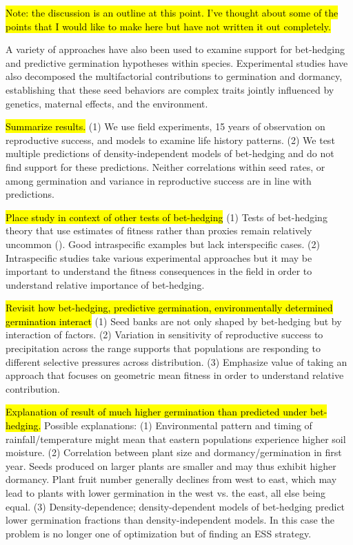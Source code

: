 \documentclass[12pt, oneside, titlepage]{article}   	%
\begin{document}
\hl{Note: the discussion is an outline at this point. I've thought about some of the points that I would like to make here but have not written it out completely.}

A variety of approaches have also been used to examine support for bet-hedging and predictive germination hypotheses within species. Experimental studies have also decomposed the multifactorial contributions to germination and dormancy, establishing that these seed behaviors are complex traits jointly influenced by genetics, maternal effects, and the environment.

\hl{Summarize results.} (1) We use field experiments, 15 years of observation on reproductive success, and models to examine life history patterns. (2) We test multiple predictions of density-independent models of bet-hedging and do not find support for these predictions. Neither correlations within seed rates, or among germination and variance in reproductive success are in line with predictions. 

\hl{Place study in context of other tests of bet-hedging} (1) Tests of bet-hedging theory that use estimates of fitness rather than proxies remain relatively uncommon (\cite{simons2011}). Good intraspecific examples but lack interspecific cases. (2) Intraspecific studies take various experimental approaches but it may be important to understand the fitness consequences in the field in order to understand relative importance of bet-hedging. 

\hl{Revisit how bet-hedging, predictive germination, environmentally determined germination interact} (1) Seed banks are not only shaped by bet-hedging but by interaction of factors. (2) Variation in sensitivity of reproductive success to precipitation across the range supports that populations are responding to different selective pressures across distribution. (3) Emphasize value of taking an approach that focuses on geometric mean fitness in order to understand relative contribution.

\hl{Explanation of result of much higher germination than predicted under bet-hedging.} Possible explanations: (1) Environmental pattern and timing of rainfall/temperature might mean that eastern populations experience higher soil moisture. (2) Correlation between plant size and dormancy/germination in first year. Seeds produced on larger plants are smaller and may thus exhibit higher dormancy. Plant fruit number generally declines from west to east, which may lead to plants with lower germination in the west vs. the east, all else being equal. (3) Density-dependence; density-dependent models of bet-hedging predict lower germination fractions than density-independent models. In this case the problem is no longer one of optimization but of finding an ESS strategy.
\end{document}
